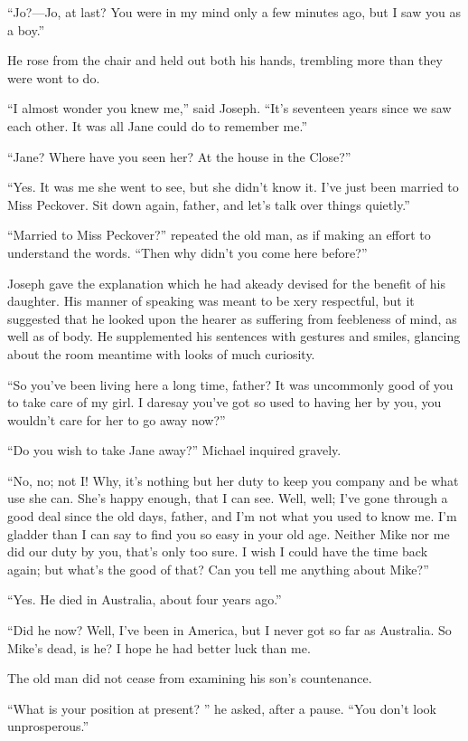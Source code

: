 ``Jo?---Jo, at last? You were in my mind only a few minutes ago, but I
saw you as a boy.''

He rose from the chair and held out both his hands, trembling more than
they were wont to do.

``I almost wonder you knew me,'' said Joseph. ``It's seventeen years
since we saw each other. It was all Jane could do to remember me.''

``Jane? Where have you seen her? At the house in the Close?''

``Yes. It was me she went to see, but she didn't know it. I've just been
married to Miss Peckover. Sit down again, father, and let's talk over
things quietly.''

``Married to Miss Peckover?'' repeated the old man, as if making an
effort to understand {}the words. ``Then why didn't you come here
before?''

Joseph gave the explanation which he had akeady devised for the benefit
of his daughter. His manner of speaking was meant to be xery respectful,
but it suggested that he looked upon the hearer as suffering from
feebleness of mind, as well as of body. He supplemented his sentences
with gestures and smiles, glancing about the room meantime with looks of
much curiosity.

``So you've been living here a long time, father? It was uncommonly good
of you to take care of my girl. I daresay you've got so used to having
her by you, you wouldn't care for her to go away now?''

``Do you wish to take Jane away?'' Michael inquired gravely.

``No, no; not I! Why, it's nothing but her duty to keep you company and
be what use she can. She's happy enough, that I can see. Well, well;
I've gone through a good deal since the old days, father, and I'm not
what you used to know me. I'm gladder {}than I can say to find you so
easy in your old age. Neither Mike nor me did our duty by you, that's
only too sure. I wish I could have the time back again; but what's the
good of that? Can you tell me anything about Mike?''

``Yes. He died in Australia, about four years ago.''

``Did he now? Well, I've been in America, but I never got so far as
Australia. So Mike's dead, is he? I hope he had better luck than me.

The old man did not cease from examining his son's countenance.

``What is your position at present? '' he asked, after a pause. ``You
don't look unprosperous.''

